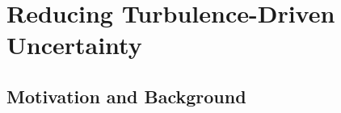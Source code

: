 \documentclass[mathserif]{beamer}
\begin{document}

\section{Reducing Turbulence-Driven Uncertainty}

\subsection{Motivation and Background}
\end{document}
